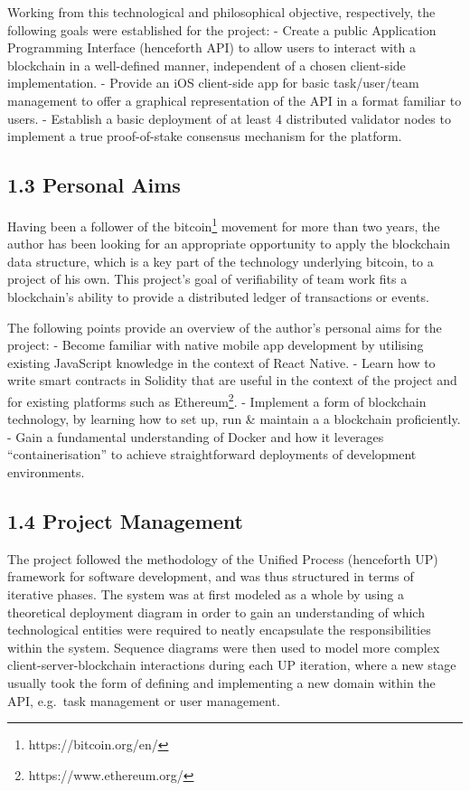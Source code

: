 \documentclass[12pt]{report}
\begin{document}
Working from this technological and philosophical objective,
respectively, the following goals were established for the project: -
Create a public Application Programming Interface (henceforth API) to
allow users to interact with a blockchain in a well-defined manner,
independent of a chosen client-side implementation. - Provide an iOS
client-side app for basic task/user/team management to offer a graphical
representation of the API in a format familiar to users. - Establish a
basic deployment of at least 4 distributed validator nodes to implement
a true proof-of-stake consensus
mechanism\cite{BitFuryGroup2015} for the platform.

\subsection{1.3 Personal Aims}\label{personal-aims}

Having been a follower of the
bitcoin\footnote{https://bitcoin.org/en/} movement for more than
two years, the author has been looking for an appropriate opportunity to
apply the blockchain data structure, which is a key part of the
technology underlying bitcoin, to a project of his own. This project's
goal of verifiability of team work fits a blockchain's ability to
provide a distributed ledger of transactions or events.

The following points provide an overview of the author's personal aims
for the project: - Become familiar with native mobile app development by
utilising existing JavaScript knowledge in the context of React
Native\cite{2react-native}. - Learn how
to write smart contracts in Solidity\cite{1solidity} that are useful
in the context of the project and for existing platforms such as
Ethereum\footnote{https://www.ethereum.org/}. - Implement a form of blockchain
technology, by learning how to set up, run \& maintain a a blockchain
proficiently. - Gain a fundamental understanding of Docker\cite{1docker} and how it leverages ``containerisation'' to achieve
straightforward deployments of development environments.

\subsection{1.4 Project Management}\label{project-management}

The project followed the methodology of the Unified Process (henceforth
UP) framework for software
development\cite{jacobson1999unified}, and was thus structured in terms of iterative
phases. The system was at first modeled as a whole by using a
theoretical deployment diagram in order to gain an understanding of
which technological entities were required to neatly encapsulate the
responsibilities within the system. Sequence diagrams were then used to
model more complex client-server-blockchain interactions during each UP
iteration, where a new stage usually took the form of defining and
implementing a new domain within the API, e.g.~task management or user
management.
\end{document}

